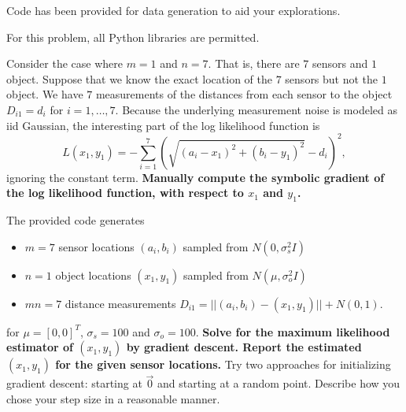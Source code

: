 Code has been provided for data generation to aid your explorations.

For this problem, all Python libraries are permitted. 

\begin{Parts}
\Part Consider the case where $m=1$ and $n=7$. That is, there are $7$
sensors and $1$ object. Suppose that we know the exact location of the
$7$ sensors but not the $1$ object. We have $7$ measurements of the
distances from each sensor to the object $D_{i1}=d_i$ for
$i=1,\dots,7$. Because the underlying measurement noise is modeled as
iid Gaussian, the interesting part of the log likelihood function is 
\begin{equation}
L(x_1,y_1) = -\sum_{i=1}^7(\sqrt{(a_i-x_1)^2+(b_i-y_1)^2}-d_i)^2,
\end{equation}
ignoring the constant term. \textbf{Manually compute the symbolic gradient of the log likelihood function, with respect to $x_1$ and $y_1$.}


\Part The provided code generates 
  \begin{itemize}
    \item $m=7$ sensor locations $(a_i, b_i)$ sampled from $N(0, \sigma_s^2 I)$
    \item $n=1$ object locations $(x_1, y_1)$ sampled from $N(\mu, \sigma_o^2 I)$ 
    \item $mn=7$ distance measurements $D_{i1} = ||(a_i,b_i)-(x_1,y_1)|| + N(0, 1)$.   
  \end{itemize}
  for $\mu=[0, 0]^T$, $\sigma_s= 100$ and
  $\sigma_o=100$. \textbf{Solve for the maximum likelihood estimator
    of $(x_1,y_1)$ by gradient descent. Report the estimated
    $(x_1,y_1)$ for the given sensor locations.} Try two approaches
  for initializing gradient descent: starting at $\vec{0}$ and
  starting at a random point. Describe how you chose your step size in
  a reasonable manner. 







\end{Parts}
